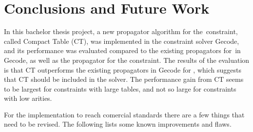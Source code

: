 \documentclass[a4paper,11pt]{article}
\newcommand{\Todo}[1]{{\color{blue}#1}}
\newcommand{\Table}{\Constraint{Table}}
\newcommand{\CTpaper}[0]{DBLP:conf/cp/DemeulenaereHLP16}
\numberwithin{equation}{section}
\begin{document}








\section{Conclusions and Future Work}
\label{conclusions}

In this bachelor thesis project, a new propagator algorithm for the~\Table constraint,
called Compact Table (CT), was implemented in the constraint solver Gecode, and its performance
was evaluated compared to the existing propagators for~\Table in Gecode, as well
as the propagator for the  constraint.
The results of the evaluation is that CT outperforms the existing propagators
in Gecode for \Table, which suggests that CT should be included in the solver.
The performance gain from CT seems to be largest for constraints with large tables,
and not so large for constraints with low arities.

For the implementation to reach comercial standards there
are a few things that need to be revised. The following lists some known
improvements and flaws.
\end{document}
